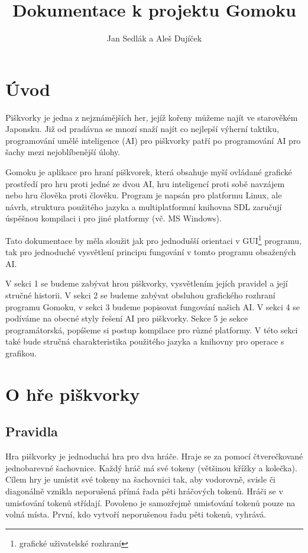 \documentclass[a4paper,11pt,titlepage]{article}
\author{Jan Sedlák a Aleš Dujíček}
\title{Dokumentace k projektu Gomoku}
\begin{document}
\maketitle
\tableofcontents
\newpage
\section{Úvod}
Piškvorky je jedna z nejznámějších her, jejíž kořeny můžeme najít ve starověkém Japonsku. Již od pradávna se mnozí snaží najít co nejlepší výherní taktiku, programování umělé inteligence (AI) pro piškvorky patří po programování AI pro šachy mezi nejoblíbenější úlohy. 

Gomoku je aplikace pro hraní piškvorek, která obsahuje myší ovládané grafické prostředí pro hru proti jedné ze dvou AI, hru inteligencí proti sobě navzájem nebo hru člověka proti člověku. Program je napsán pro platformu Linux, ale návrh, struktura použitého jazyka a multiplatformní knihovna SDL zaručují úspěšnou kompilaci i pro jiné platformy (vč. MS Windows).

Tato dokumentace by měla sloužit jak pro jednodušší orientaci v GUI\footnote{grafické uživatelské rozhraní} programu, tak pro jednoduché vysvětlení principu fungování v tomto programu obsažených AI.

V sekci 1 se budeme zabývat hrou piškvorky, vysvětlením jejích pravidel a její stručné historii. V sekci 2 se budeme zabývat obsluhou grafického rozhraní programu Gomoku, v sekci 3 budeme popisovat fungování našich AI. V sekci 4 se podíváme na obecné styly řešení AI pro piškvorky. Sekce 5 je sekce programátorská, popíšeme si postup kompilace pro různé platformy. V této sekci také bude stručná charakteristika použitého jazyka a knihovny pro operace s grafikou.
\newpage
\section{O hře piškvorky}
\subsection{Pravidla}
Hra piškvorky je jednoduchá hra pro dva hráče. Hraje se za pomocí čtve\-reč\-ko\-va\-né jednobarevné šachovnice. Každý hráč má své tokeny (většinou křížky a kolečka). Cílem hry je umístit své tokeny na šachovnici tak, aby vodorovně, svisle či diagonálně vznikla neporušená přímá řada pěti hráčových tokenů. Hráči se v umisťování tokenů střídají. Povoleno je samozřejmě umisťování tokenů pouze na volná místa. První, kdo vytvoří neporušenou řadu pěti tokenů, vyhrává. 
\end{document}
